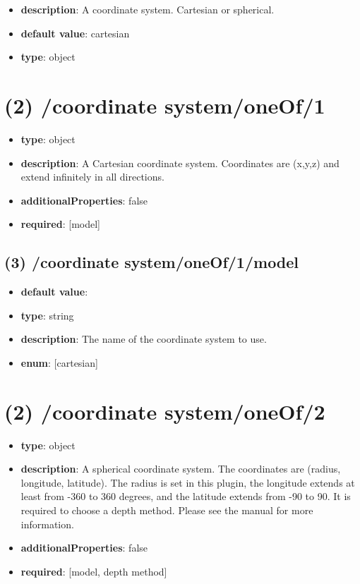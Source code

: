 \begin{itemize}[leftmargin=1em]\item {\bf description}: A coordinate system. Cartesian or spherical.
\item {\bf default value}: cartesian
\item {\bf type}: object
\end{itemize}
\section{(2) /coordinate system/oneOf/1}
\begin{itemize}[leftmargin=2em]\item {\bf type}: object
\item {\bf description}: A Cartesian coordinate system. Coordinates are (x,y,z) and extend infinitely in all directions.
\item {\bf additionalProperties}: false
\item {\bf required}: [model]\end{itemize}
\subsection{(3) /coordinate system/oneOf/1/model}
\begin{itemize}[leftmargin=3em]\item {\bf default value}: 
\item {\bf type}: string
\item {\bf description}: The name of the coordinate system to use.
\item {\bf enum}: [cartesian]\end{itemize}\section{(2) /coordinate system/oneOf/2}
\begin{itemize}[leftmargin=2em]\item {\bf type}: object
\item {\bf description}: A spherical coordinate system. The coordinates are (radius, longitude, latitude). The radius is set in this plugin, the longitude extends at least from -360 to 360 degrees, and the latitude extends from -90 to 90. It is required to choose a depth method. Please see the manual for more information.
\item {\bf additionalProperties}: false
\item {\bf required}: [model, depth method]\end{itemize}
